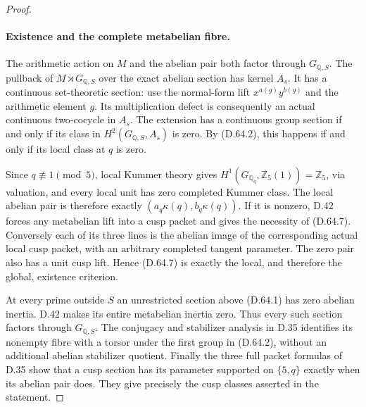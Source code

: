 \begin{proof}
\paragraph{Existence and the complete metabelian fibre.}
The arithmetic action on \(M\) and the abelian pair
both factor through \(G_{\mathbb Q,S}\). The pullback
of \(M\rtimes G_{\mathbb Q,S}\) over the exact abelian
section has kernel \(A_s\). It has a continuous
set-theoretic section: use the normal-form lift
\(x^{a(g)}y^{b(g)}\) and the arithmetic element \(g\).
Its multiplication defect is consequently an actual
continuous two-cocycle in \(A_s\). The extension has
a continuous group section if and only if its class
in \(H^2(G_{\mathbb Q,S},A_s)\) is zero. By (D.64.2),
this happens if and only if its local class at \(q\)
is zero.

Since \(q\not\equiv1\pmod5\), local Kummer theory gives
\(H^1(G_{\mathbb Q_q},\mathbb Z_5(1))=\mathbb Z_5\),
via valuation, and every local unit has zero completed
Kummer class. The local abelian pair is therefore
exactly \((a_q\kappa(q),b_q\kappa(q))\). If it is
nonzero, D.42 forces any metabelian lift into a cusp
packet and gives the necessity of (D.64.7).
Conversely each of its three lines is the abelian
image of the corresponding actual local cusp packet,
with an arbitrary completed tangent parameter.
The zero pair also has a unit cusp lift. Hence
(D.64.7) is exactly the local, and therefore the
global, existence criterion.

At every prime outside \(S\) an unrestricted section
above (D.64.1) has zero abelian inertia. D.42 makes
its entire metabelian inertia zero. Thus every such
section factors through \(G_{\mathbb Q,S}\). The
conjugacy and stabilizer analysis in D.35 identifies
its nonempty fibre with a torsor under the first
group in (D.64.2), without an additional abelian
stabilizer quotient. Finally the three full packet
formulas of D.35 show that a cusp section has its
parameter supported on \(\{5,q\}\) exactly when its
abelian pair does. They give precisely the cusp
classes asserted in the statement.
\end{proof}

